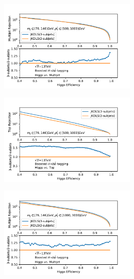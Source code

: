 \begin{figure}[htbp]
\begin{subfigure}{.5\textwidth}
     \caption{}
  \end{subfigure}
 \newline 
   \begin{subfigure}{.5\textwidth}
  \centering
   \includegraphics[width=0.75\textwidth]{figuresXbb/Subjet/SUBQCDMASSPT2.pdf}
     \caption{}
  \end{subfigure}
  \begin{subfigure}{.5\textwidth}
  \centering
   \includegraphics[width=0.75\textwidth]{figuresXbb/Subjet/SUBTopMASSPT2.pdf}
     \caption{}
  \end{subfigure}
 \newline 
   \begin{subfigure}{.5\textwidth}
  \centering
   \includegraphics[width=0.75\textwidth]{figuresXbb/Subjet/SUBQCDMASSPT3.pdf}

\end{subfigure}
\end{figure}
